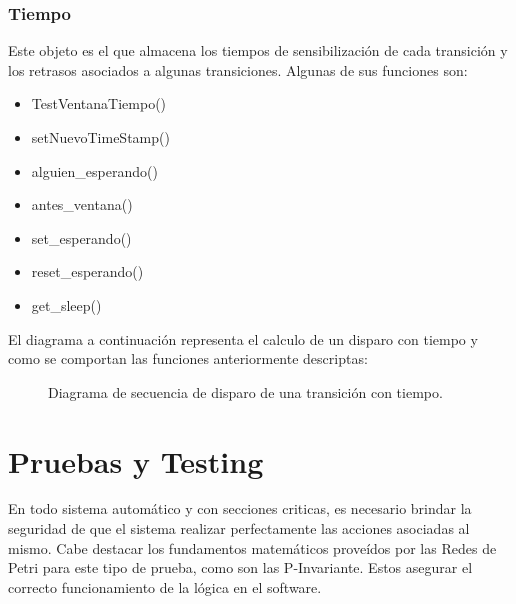 \documentclass[10pt, a4paper,notitlepage]{article}
\begin{document}
\subsubsection{Tiempo}
Este objeto es el que almacena los tiempos de sensibilización de cada transición y los retrasos asociados a algunas transiciones. Algunas de sus funciones son:
\begin{itemize}
	\item TestVentanaTiempo()
	\item setNuevoTimeStamp()
	\item alguien\_esperando()	
	\item antes\_ventana()	
	\item set\_esperando()	
	\item reset\_esperando()
	\item get\_sleep()			
\end{itemize}
El diagrama a continuación representa el calculo de un disparo con tiempo y como se comportan las funciones anteriormente descriptas:
\begin{figure}[H] %
	\caption{Diagrama de secuencia de disparo de una transición con tiempo.}
	\label{fig:sec2}
\end{figure}

\section{Pruebas y Testing}
En todo sistema automático y con secciones criticas, es necesario brindar la seguridad de que el sistema realizar perfectamente las acciones asociadas al mismo.
Cabe destacar los fundamentos matemáticos proveídos por las Redes de Petri para este tipo de prueba, como son las P-Invariante. Estos asegurar el correcto funcionamiento de la lógica en el software.
\end{document}
